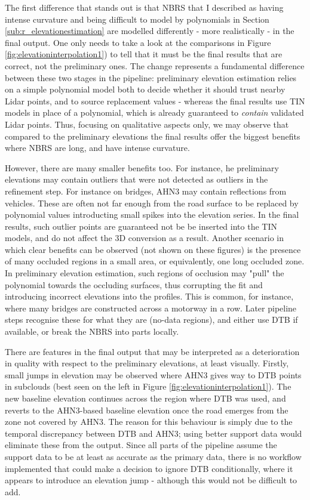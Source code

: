 The first difference that stands out is that NBRS that I described as having intense curvature and being difficult to model by polynomials in Section \ref{sub:r_elevationestimation} are modelled differently - more realistically - in the final output. One only needs to take a look at the comparisons in Figure \ref{fig:elevationinterpolation1}) to tell that it must be the final results that are correct, not the preliminary ones. The change represents a fundamental difference between these two stages in the pipeline: preliminary elevation estimation relies on a simple polynomial model both to decide whether it should trust nearby Lidar points, and to source replacement values - whereas the final results use TIN models in place of a polynomial, which is already guaranteed to \textit{contain} validated Lidar points. Thus, focusing on qualitative aspects only, we may observe that compared to the preliminary elevations the final results offer the biggest benefits where NBRS are long, and have intense curvature.

However, there are many smaller benefits too. For instance, he preliminary elevations may contain outliers that were not detected as outliers in the refinement step. For instance on bridges, AHN3 may contain reflections from vehicles. These are often not far enough from the road surface to be replaced by polynomial values introducting small spikes into the elevation series. In the final results, such outlier points are guaranteed not be be inserted into the TIN models, and do not affect the 3D conversion as a result. Another scenario in which clear benefits can be observed (not shown on these figures) is the presence of many occluded regions in a small area, or equivalently, one long occluded zone. In preliminary elevation estimation, such regions of occlusion may "pull" the polynomial towards the occluding surfaces, thus corrupting the fit and introducing incorrect elevations into the profiles. This is common, for instance, where many bridges are constructed across a motorway in a row. Later pipeline steps recognise these for what they are (no-data regions), and either use DTB if available, or break the NBRS into parts locally.

There are features in the final output that may be interpreted as a deterioration in quality with respect to the preliminary elevations, at least visually. Firstly, small jumps in elevation may be observed where AHN3 gives way to DTB points in subclouds (best seen on the left in Figure \ref{fig:elevationinterpolation1}). The new baseline elevation continues across the region where DTB was used, and reverts to the AHN3-based baseline elevation once the road emerges from the zone not covered by AHN3. The reason for this behaviour is simply due to the temporal discrepancy between DTB and AHN3; using better support data would eliminate these from the output. Since all parts of the pipeline assume the support data to be at least as accurate as the primary data, there is no workflow implemented that could make a decision to ignore DTB conditionally, where it appears to introduce an elevation jump - although this would not be difficult to add.

